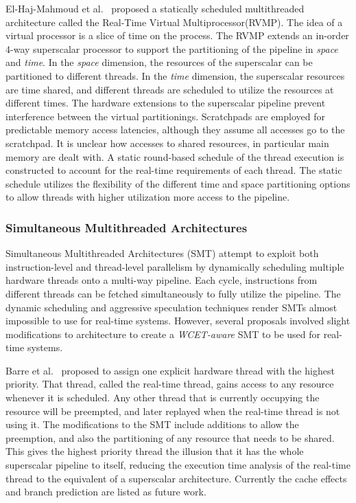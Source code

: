 El-Haj-Mahmoud et al.~\cite{El-Haj-Mahmoud2005VirtualMultiprocessor} proposed a statically scheduled multithreaded architecture called the Real-Time Virtual Multiprocessor(RVMP).   
The idea of a virtual processor is a slice of time on the process. 
The RVMP extends an in-order 4-way superscalar processor to support the partitioning of the pipeline in \emph{space} and \emph{time}.  
In the \emph{space} dimension, the resources of the superscalar can be partitioned to different threads. 
In the \emph{time} dimension, the superscalar resources are time shared, and different threads are scheduled to utilize the resources at different times.  
The hardware extensions to the superscalar pipeline prevent interference between the virtual partitionings.
Scratchpads are employed for predictable memory access latencies, although they assume all accesses go to the scratchpad. 
It is unclear how accesses to shared resources, in particular main memory are dealt with.
A static round-based schedule of the thread execution is constructed to account for the real-time requirements of each thread.
The static schedule utilizes the flexibility of the different time and space partitioning options to allow threads with higher utilization more access to the pipeline. 

\subsubsection{Simultaneous Multithreaded Architectures} 
\label{sec:RTSMT}
Simultaneous Multithreaded Architectures (SMT) attempt to exploit both instruction-level and thread-level parallelism by dynamically scheduling multiple hardware threads onto a multi-way pipeline. 
Each cycle, instructions from different threads can be fetched simultaneously to fully utilize the pipeline.
The dynamic scheduling and aggressive speculation techniques render SMTs almost impossible to use for real-time systems.  
However, several proposals involved slight modifications to architecture to create a \emph{WCET-aware} SMT to be used for real-time systems.  

Barre et al.~\cite{Barre2008RTSMT} proposed to assign one explicit hardware thread with the highest priority. 
That thread, called the real-time thread, gains access to any resource whenever it is scheduled. 
Any other thread that is currently occupying the resource will be preempted, and later replayed when the real-time thread is not using it.
The modifications to the SMT include additions to allow the preemption, and also the partitioning of any resource that needs to be shared. 
This gives the highest priority thread the illusion that it has the whole superscalar pipeline to itself, reducing the execution time analysis of the real-time thread to the equivalent of a superscalar architecture. 
Currently the cache effects and branch prediction are listed as future work.  

